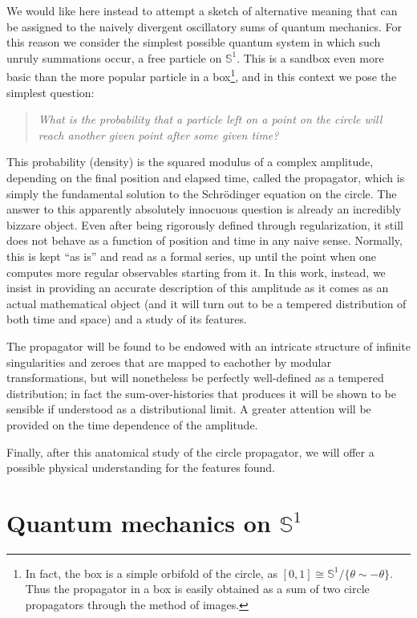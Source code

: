 \documentclass{article}
\newcommand{\ess}{\ensuremath{\mathbb{S}}}
\begin{document}
We would like here instead to attempt a sketch of alternative meaning that can be assigned to the naively divergent oscillatory sums of quantum mechanics. For this reason we consider the simplest possible quantum system in which such unruly summations occur, a free particle on $\mathbb{S}^1$. This is a sandbox even more basic than the more popular particle in a box\footnote{In fact, the box is a simple orbifold of the circle, as $[0,1] \cong \mathbb{S}^1/\{\theta \sim - \theta\}$. Thus the propagator in a box is easily obtained as a sum of two circle propagators through the method of images.}, and in this context we pose the simplest question:

\begin{quote} \emph{What is the probability that a particle left on a point on the circle will reach another given point after some given time?} \end{quote}

This probability (density) is the squared modulus of a complex amplitude, depending on the final position and elapsed time, called the propagator, which is simply the fundamental solution to the Schr\"odinger equation on the circle. The answer to this apparently absolutely innocuous question is already an incredibly bizzare object. Even after being rigorously defined through regularization, it still does not behave as a function of position and time in any naive sense. Normally, this is kept ``as is'' and read as a formal series, up until the point when one computes more regular observables starting from it. In this work, instead, we insist in providing an accurate description of this amplitude as it comes as an actual mathematical object (and it will turn out to be a tempered distribution of both time and space) and a study of its features.

The propagator will be found to be endowed with an intricate structure of infinite singularities and zeroes that are mapped to eachother by modular transformations, but will nonetheless be perfectly well-defined as a tempered distribution; in fact the sum-over-histories that produces it will be shown to be sensible if understood as a distributional limit. A greater attention will be provided on the time dependence of the amplitude.

Finally, after this anatomical study of the circle propagator, we will offer a possible physical understanding for the features found.

\section{Quantum mechanics on $\ess^1$}
\end{document}
